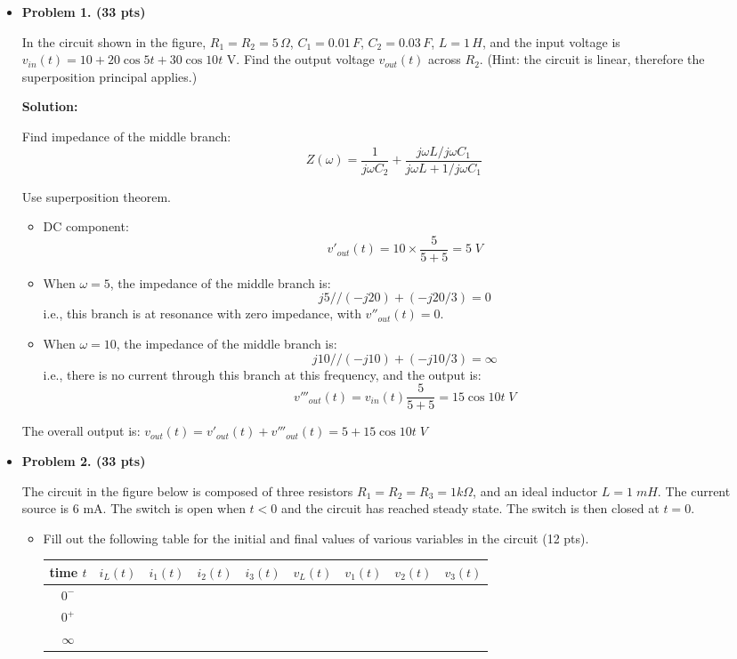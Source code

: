 \documentclass{article}
\begin{document}
\begin{itemize}

\item {\bf Problem 1. (33 pts)}

In the circuit shown in the figure, $R_1=R_2=5\,\Omega$, $C_1=0.01\,F$,
$C_2=0.03\,F$, $L=1\,H$, and the input voltage is 
$v_{in}(t)=10+20\cos 5 t+30 \cos 10 t$ V. Find the output voltage $v_{out}(t)$
across $R_2$. (Hint: the circuit is linear, therefore the superposition
principal applies.)


{\bf Solution:} 

Find impedance of the middle branch:
\[
Z(\omega)=\frac{1}{j\omega C_2}
+\frac{j\omega L/j\omega C_1}{j\omega L+1/j\omega C_1}
\]

Use superposition theorem. 
\begin{itemize}
  \item DC component: 
    \[ v'_{out}(t)=10\times \frac{5}{5+5}=5\;V \]
  \item When $\omega=5$, the impedance of the middle branch is:
    \[ j5 // (-j 20)+(-j 20/3)=0 \]
    i.e., this branch is at resonance with zero impedance, with $v''_{out}(t)=0$.
  \item When $\omega=10$, the impedance of the middle branch is:
    \[ j10 // (-j 10)+(-j 10/3)=\infty \]
    i.e., there is no current through this branch at this frequency,
    and the output is:
    \[ v'''_{out}(t)=v_{in}(t)\frac{5}{5+5}=15\cos 10 t\; V \]
\end{itemize}
The overall output is: $v_{out}(t)=v'_{out}(t)+v'''_{out}(t)=5+15 \cos 10 t\;V$

\item {\bf Problem 2. (33 pts)}

The circuit in the figure below is composed of three resistors
$R_1=R_2=R_3=1k\Omega$, and an ideal inductor $L=1\;mH$. The current source 
is 6 mA. The switch is open when $t<0$ and the circuit has reached steady
state. The switch is then closed at $t=0$. 


\begin{itemize}

\item Fill out the following table for the initial and final values of various
variables in the circuit (12 pts).

\begin{tabular}{c||cccc|cccc} \hline
  time $t$&$i_L(t)$&$i_1(t)$&$i_2(t)$&$i_3(t)$&$v_L(t)$&$v_1(t)$&$v_2(t)$&$v_3(t)$\\ \hline \hline
  $0^-$    & & & & & & & & \\ \hline
  $0^+$    & & & & & & & & \\ \hline
  $\infty$ & & & & & & & & \\ \hline
\end{tabular}


\end{itemize}
\end{itemize}
\end{document}
